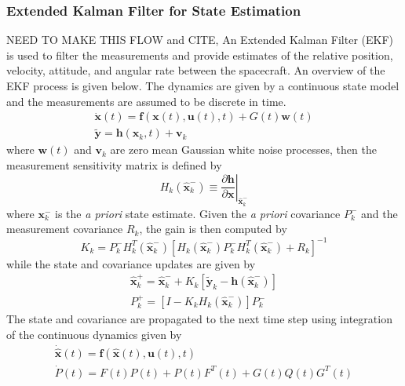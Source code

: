 \documentclass[conf]{new-aiaa}
\begin{document}
\subsubsection{Extended Kalman Filter for State Estimation}
{\color{red} NEED TO MAKE THIS FLOW and CITE\cite{me}, \cite{markley}}
An Extended Kalman Filter (EKF) is used to filter the measurements and provide estimates of the relative position, velocity, attitude, and angular rate between the spacecraft.  An overview of the EKF process is given below.  The dynamics are given by a continuous state model and the measurements are assumed to be discrete in time.
\begin{subequations}\begin{gather}
\dot{\bm x}(t) = {\bm f}({\bm x}(t), {\bm u}(t), t) + G(t){\bm w}(t) \\
\tilde{\bm y} = {\bm h}({\bm x}_k, t) + {\bm v}_k
\end{gather}\end{subequations}
where ${\bm w}(t)$ and ${\bm v}_k$ are zero mean Gaussian white noise processes, then the measurement sensitivity matrix is defined by
\begin{equation}
    \left. H_k\left(\hat{\bm x}_k^-\right) \equiv \frac{\partial {\bm h}}{\partial {\bm x}}\right\vert_{\hat{\bm x}_k^-}
\end{equation}
where $\bm x_k^-$ is the \textit{a priori} state estimate.  Given the \textit{a priori} covariance $P_k^-$ and the measurement covariance $R_k$, the gain is then computed by
\begin{equation}
    K_k = P_k^-H_k^T\left(\hat{\bm x}_k^-\right)\left[H_k\left(\hat{\bm x}_k^-\right)P_k^-H_k^T\left(\hat{\bm x}_k^-\right) + R_k\right]^{-1}
\end{equation}
while the state and covariance updates are given by
\begin{subequations}\begin{gather}
    \hat{\bm x}_k^+ = \hat{\bm x}_k^- + K_k\left[\tilde{\bm y}_k - {\bm h}\left(\hat{\bm x}_k^-\right)\right]\\
    P_k^+ = \left[I - K_k H_k\left(\hat{\bm x}_k^-\right)\right]P_k^-
\end{gather}\end{subequations}
The state and covariance are propagated to the next time step using integration of the continuous dynamics given by
\begin{subequations}\begin{gather}
    \dot{\hat{\bm x}}(t) = {\bm f}(\hat{\bm x}(t),{\bm u}(t),t)\\
    \dot{P}(t) = F(t)P(t) + P(t)F^T(t) + G(t)Q(t)G^T(t)
\end{gather}\end{subequations}
\end{document}
